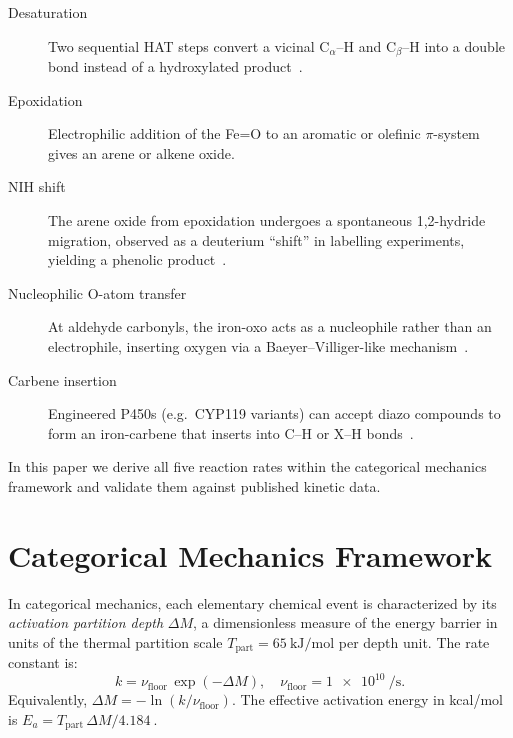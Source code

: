 \documentclass[11pt,twocolumn,a4paper]{article}
\begin{document}
\begin{description}
\item[Desaturation] Two sequential HAT steps convert a vicinal $\text{C}_\alpha$--H
  and $\text{C}_\beta$--H into a double bond instead of a hydroxylated product~\citep{Bhatt2013}.
\item[Epoxidation] Electrophilic addition of the Fe=O to an aromatic or
  olefinic $\pi$-system gives an arene or alkene oxide.
\item[NIH shift] The arene oxide from epoxidation undergoes a spontaneous
  1,2-hydride migration, observed as a deuterium ``shift'' in labelling
  experiments, yielding a phenolic product~\citep{Korzekwa1989}.
\item[Nucleophilic O-atom transfer] At aldehyde carbonyls, the iron-oxo
  acts as a nucleophile rather than an electrophile, inserting oxygen via a
  Baeyer--Villiger-like mechanism~\citep{Watanabe2001}.
\item[Carbene insertion] Engineered P450s (e.g.\ CYP119 variants) can accept
  diazo compounds to form an iron-carbene that inserts into C--H or X--H bonds~\citep{Coelho2013,Wang2014}.
\end{description}

In this paper we derive all five reaction rates within the categorical
mechanics framework and validate them against published kinetic data.

\section{Categorical Mechanics Framework}

In categorical mechanics, each elementary chemical event is characterized
by its \emph{activation partition depth} $\Delta M$, a dimensionless measure
of the energy barrier in units of the thermal partition scale
$T_\text{part} = \SI{65}{\kilo\joule\per\mole}$ per depth unit.  The rate
constant is:
\begin{equation}
  k = \nu_\text{floor}\,\exp(-\Delta M), \quad
  \nu_\text{floor} = \SI{1e10}{\per\second}.
  \label{eq:rate}
\end{equation}
Equivalently, $\Delta M = -\ln(k/\nu_\text{floor})$.  The effective
activation energy in kcal/mol is $E_a = T_\text{part}\,\Delta M / \SI{4.184}{}$.
\end{document}
